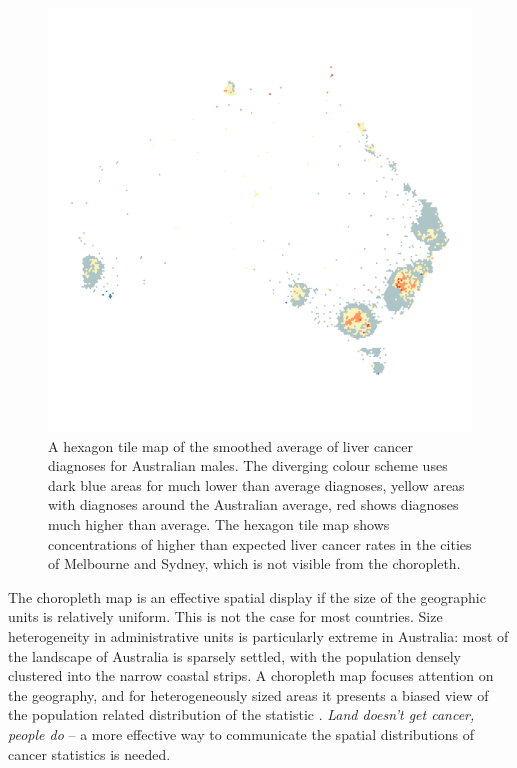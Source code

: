 \documentclass[12pt]{article}
\begin{document}
\begin{figure}
\includegraphics[width=1\linewidth]{kobakiancook_files/figure-latex/liver-hex-1} \caption{A hexagon tile map of the smoothed average of liver cancer diagnoses for Australian males. The diverging colour scheme uses dark blue areas for much lower than average diagnoses, yellow areas with diagnoses around the Australian average, red shows diagnoses much higher than average. The hexagon tile map shows concentrations of higher than expected liver cancer rates in the cities of Melbourne and Sydney, which is not visible from the choropleth.}\label{fig:liver-hex}
\end{figure}

The choropleth map is an effective spatial display if the size of the
geographic units is relatively uniform. This is not the case for most
countries. Size heterogeneity in administrative units is particularly
extreme in Australia: most of the landscape of Australia is sparsely
settled, with the population densely clustered into the narrow coastal
strips. A choropleth map focuses attention on the geography, and for
heterogeneously sized areas it presents a biased view of the population
related distribution of the statistic \citep{CBATCC}. \emph{Land doesn't
get cancer, people do} -- a more effective way to communicate the
spatial distributions of cancer statistics is needed.
\end{document}
